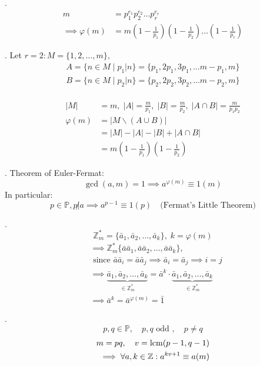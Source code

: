 \Theorem.
\begin{align*}
  m &= p_1^{e_1} p_2^{e_2} \ldots p_r^{e_r} \\
  \implies \varphi(m) &= m \left( 1-\frac{1}{p_1} \right) \left( 1-\frac{1}{p_2} \right) \ldots \left( 1-\frac{1}{p_r} \right)
\end{align*}

\Proof.
Let $r=2: M = \{1,2, \ldots, m\},$
\begin{align*}
  A = \{ n \in M \mid p_1|n\} = \{p_1, 2p_1, 3p_1, \ldots m-p_1, m\} \\
  B = \{ n \in M \mid p_2|n\} = \{p_2, 2p_2, 3p_2, \ldots m-p_2, m\} \\
\end{align*}

\begin{align*}
  |M| &= m, \; |A| = \frac{m}{p_1}, \; |B| = \frac{m}{p_2}, \;
    |A \cap B| = \frac{m}{p_1p_2}\\
  \varphi(m)
    &= | M \backslash(A\cup B) | \\
    &= |M| - |A| - |B| + | A \cap B|\\
    &= m \left(1- \frac{1}{p_1} \right) \left(1- \frac{1}{p_2} \right)
\end{align*}

\Theorem.
Theorem of Euler-Fermat:
\[
  \gcd(a,m) = 1 \implies a ^{\varphi(m)} \equiv 1 (m)
\]
In particular:
\[
  p \in \mathbb{P}, p \not| a \implies a^{p-1} \equiv 1 (p) \quad
  \text{(Fermat's Little Theorem)}
\]

\Proof.
\[
  \mathbb{Z}_m^{*} = \{\bar{a}_1, \bar{a}_2, \ldots, \bar{a}_k \}, \;k = \varphi(m)
\]
\begin{align*}
  &\implies \mathbb{Z}_m^{*} \{\bar{a}\bar{a}_1, \bar{a}\bar{a}_2, \ldots, \bar{a}\bar{a}_k \}, \\
  &\text{ since } \bar{a}\bar{a}_i = \bar{a}\bar{a}_j
    \implies \bar{a}_i = \bar{a}_j \implies i = j \\
  &\implies \underbrace{\bar{a}_1, \bar{a}_2, \ldots, \bar{a}_k}_
        {\in \mathbb{Z}_m^{*}}
      = \bar{a}^k \cdot \underbrace{\bar{a}_1, \bar{a}_2, \ldots, \bar{a}_k}_
        {\in \mathbb{Z}_m^{*}} \\
  &\implies \bar{a}^k = \bar{a}^{\varphi(m)} = \bar{1}
\end{align*}

\Theorem.
\[
  p, q \in \mathbb{P}, \quad p,q \text{ odd }, \quad p \neq q
\]
\begin{align*}
  m = pq, \quad v = \operatorname{lcm}(p-1, q-1) \\
  \implies \forall a,k \in \mathbb{Z}: a^{kv + 1} \equiv a(m)
\end{align*}

